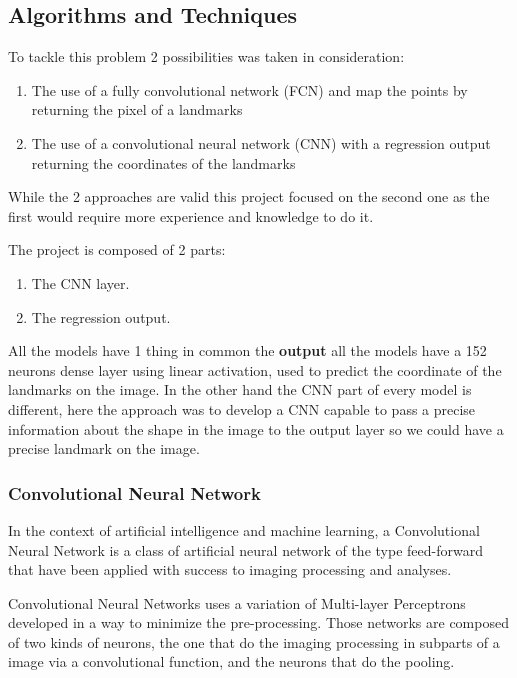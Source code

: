 \documentclass[11pt]{article}
\begin{document}
\subsection{Algorithms and Techniques}
\label{sec:orgfd833c7}

To tackle this problem 2 possibilities was taken in consideration:

\begin{enumerate}
\item The use of a fully convolutional network (FCN) and map the points by
returning the pixel of a landmarks
\item The use of a convolutional neural network (CNN) with a regression output
returning the coordinates of the landmarks
\end{enumerate}

While the 2 approaches are valid this project focused on the second one as
the first would require more experience and knowledge to do it.

The project is composed of 2 parts:
\begin{enumerate}
\item The CNN layer.
\item The regression output.
\end{enumerate}

All the models have 1 thing in common the \textbf{output} all the models have a
152 neurons dense layer using linear activation, used to predict the
coordinate of the landmarks on the image.
In the other hand the CNN part of every model is different, here the approach
was to develop a CNN capable to pass a precise information about the shape in
the image to the output layer so we could have a precise landmark on the
image. 

\subsubsection{Convolutional Neural Network}
\label{sec:orgbae05e7}

In the context of artificial intelligence and machine learning, a
Convolutional Neural Network is a class of artificial neural network of the
type feed-forward that have been applied with success to imaging processing
and analyses.

Convolutional Neural Networks uses a variation of Multi-layer Perceptrons developed in a way to
minimize the pre-processing. Those networks are composed of two kinds of
neurons, the one that do the imaging processing in subparts of a image via a
convolutional function, and the neurons that do the pooling. 
\end{document}
